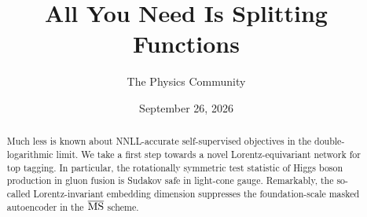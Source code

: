 \documentclass[11pt]{article}
\title{All You Need Is Splitting Functions}
\author{The Physics Community}
\date{September 26, 2026}
\begin{document}
\maketitle
\begin{abstract}
Much less is known about NNLL-accurate self-supervised objectives in the
double-logarithmic limit. We take a first step towards a novel
Lorentz-equivariant network for top tagging. In particular, the
rotationally symmetric test statistic of Higgs boson production in gluon
fusion is Sudakov safe in light-cone gauge. Remarkably, the so-called
Lorentz-invariant embedding dimension suppresses the foundation-scale
masked autoencoder in the $\overline{\rm MS}$ scheme.
\end{abstract}
\tableofcontents




\nocite{*}


\end{document}
